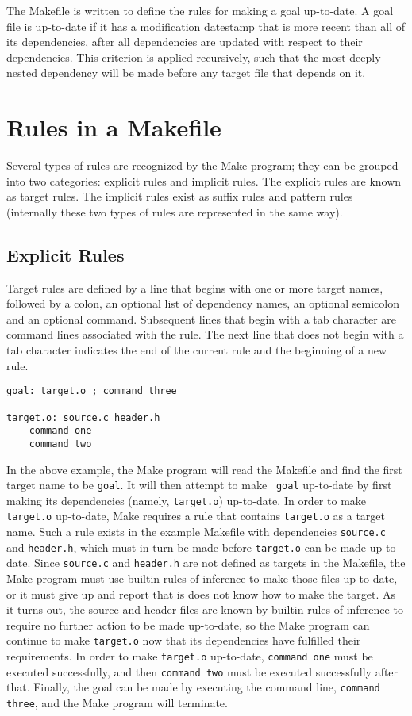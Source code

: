 The Makefile is written to define the rules for making a goal up-to-date.
A goal file is up-to-date if it has a modification datestamp that is more
recent than all of its dependencies, after all dependencies are updated
with respect to their dependencies.  This criterion is applied recursively,
such that the most deeply nested dependency will be made before any target
file that depends on it.

\section{Rules in a Makefile}

Several types of rules are recognized by the Make program; they can be
grouped into two categories:  explicit rules and implicit rules.  The
explicit rules are known as target rules.  The implicit rules exist as
suffix rules and pattern rules (internally these two types of rules are
represented in the same way).

\subsection{Explicit Rules}

Target rules are defined by a line that begins with one or more target
names, followed by a colon, an optional list of dependency names, an
optional semicolon and an optional command.  Subsequent lines that begin
with a tab character are command lines associated with the rule.  The next
line that does not begin with a tab character indicates the end of the
current rule and the beginning of a new rule.

\begin{verbatim}
goal: target.o ; command three

target.o: source.c header.h
    command one
    command two
\end{verbatim}

In the above example, the Make program will read the Makefile and find the
first target name to be {\tt goal}.  It will then attempt to make {\tt
goal} up-to-date by first making its dependencies (namely, {\tt target.o})
up-to-date.  In order to make {\tt target.o} up-to-date, Make requires a
rule that contains {\tt target.o} as a target name.  Such a rule exists
in the example Makefile with dependencies {\tt source.c} and {\tt header.h},
which must in turn be made before {\tt target.o} can be made up-to-date.
Since {\tt source.c} and {\tt header.h} are not defined as targets in the
Makefile, the Make program must use builtin rules of inference to make
those files up-to-date, or it must give up and report that is does not
know how to make the target.  As it turns out, the source and header files
are known by builtin rules of inference to require no further action to be
made up-to-date, so the Make program can continue to make {\tt target.o}
now that its dependencies have fulfilled their requirements.  In order to
make {\tt target.o} up-to-date, {\tt command one} must be executed
successfully, and then {\tt command two} must be executed successfully
after that.  Finally, the goal can be made by executing the command line,
{\tt command three}, and the Make program will terminate.

